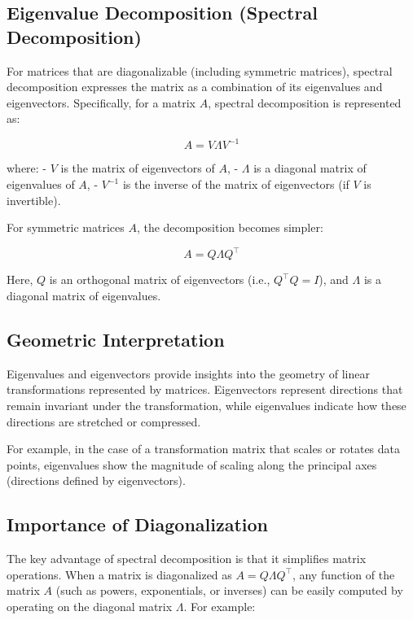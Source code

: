 \documentclass[
  letterpaper,
  DIV=11,
  numbers=noendperiod]{scrreprt}
\theoremstyle{plain}
\theoremstyle{definition}
\theoremstyle{remark}
\begin{document}
\subsection{Eigenvalue Decomposition (Spectral
Decomposition)}\label{eigenvalue-decomposition-spectral-decomposition}

For matrices that are diagonalizable (including symmetric matrices),
spectral decomposition expresses the matrix as a combination of its
eigenvalues and eigenvectors. Specifically, for a matrix \(A\), spectral
decomposition is represented as:

\[
A = V \Lambda V^{-1}
\]

where: - \(V\) is the matrix of eigenvectors of \(A\), - \(\Lambda\) is
a diagonal matrix of eigenvalues of \(A\), - \(V^{-1}\) is the inverse
of the matrix of eigenvectors (if \(V\) is invertible).

For symmetric matrices \(A\), the decomposition becomes simpler:

\[
A = Q \Lambda Q^\top
\]

Here, \(Q\) is an orthogonal matrix of eigenvectors (i.e.,
\(Q^\top Q = I\)), and \(\Lambda\) is a diagonal matrix of eigenvalues.

\subsection{Geometric Interpretation}\label{geometric-interpretation}

Eigenvalues and eigenvectors provide insights into the geometry of
linear transformations represented by matrices. Eigenvectors represent
directions that remain invariant under the transformation, while
eigenvalues indicate how these directions are stretched or compressed.

For example, in the case of a transformation matrix that scales or
rotates data points, eigenvalues show the magnitude of scaling along the
principal axes (directions defined by eigenvectors).

\subsection{Importance of
Diagonalization}\label{importance-of-diagonalization}

The key advantage of spectral decomposition is that it simplifies matrix
operations. When a matrix is diagonalized as \(A = Q \Lambda Q^\top\),
any function of the matrix \(A\) (such as powers, exponentials, or
inverses) can be easily computed by operating on the diagonal matrix
\(\Lambda\). For example:
\end{document}
